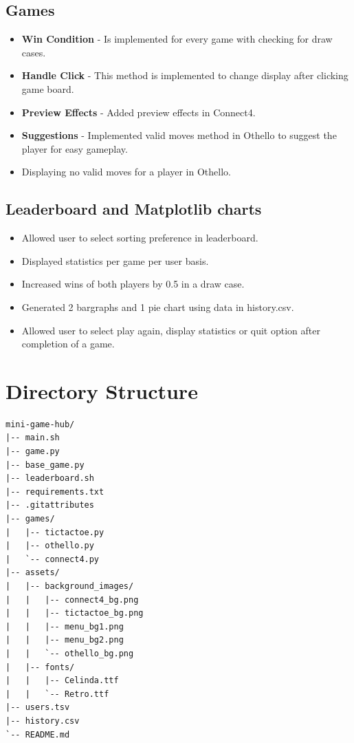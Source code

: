\documentclass[12pt, letterpaper]{article}
\begin{document}
\subsection{Games}
\begin{itemize}
    \item \textbf{Win Condition} - Is implemented for every game with checking for draw cases.
    \item \textbf{Handle Click} - This method is implemented to change display after clicking game board.
    \item \textbf{Preview Effects} - Added preview effects in Connect4.
    \item \textbf{Suggestions} - Implemented valid moves method in Othello to suggest the player for easy gameplay.
    \item Displaying no valid moves for a player in Othello.
\end{itemize}

\subsection{Leaderboard and Matplotlib charts}
\begin{itemize}
    \item Allowed user to select sorting preference in leaderboard.
    \item Displayed statistics per game per user basis.
    \item Increased wins of both players by 0.5 in a draw case.
    \item Generated 2 bargraphs and 1 pie chart using data in history.csv.
    \item Allowed user to select play again, display statistics or quit option after completion of a game.
\end{itemize}

\section{Directory Structure}
\begin{verbatim}
mini-game-hub/
|-- main.sh
|-- game.py
|-- base_game.py
|-- leaderboard.sh
|-- requirements.txt
|-- .gitattributes
|-- games/
|   |-- tictactoe.py
|   |-- othello.py
|   `-- connect4.py
|-- assets/
|   |-- background_images/
|   |   |-- connect4_bg.png
|   |   |-- tictactoe_bg.png
|   |   |-- menu_bg1.png
|   |   |-- menu_bg2.png
|   |   `-- othello_bg.png
|   |-- fonts/
|   |   |-- Celinda.ttf
|   |   `-- Retro.ttf
|-- users.tsv
|-- history.csv
`-- README.md
\end{verbatim}
\end{document}
